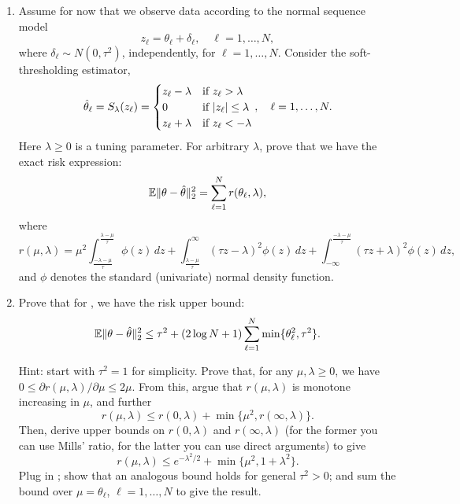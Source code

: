 \documentclass{article}
\begin{document}
\begin{enumerate}[label=(\alph*)]
\item Assume for now that we observe data according to the normal sequence model  
  \begin{equation}
  \label{eq:sequence_model}
  z_\ell = \theta_\ell + \delta_\ell, \quad \ell=1,\dots,N,  
  \end{equation}
  where $\delta_\ell \sim N(0,\tau^2)$, independently, for
  $\ell=1,\dots,N$. Consider the soft-thresholding estimator,
  \[
  \hat{\theta}_\ell = S_\lambda(z_\ell) 
  = \begin{cases}
    z_\ell-\lambda & \text{if $z_\ell > \lambda$} \\
    0 & \text{if $|z_\ell| \leq \lambda$} \\
    z_\ell+\lambda & \text{if $z_\ell < -\lambda$}
  \end{cases}, 
  \quad \ell=1,\dots,N.
  \]
  Here $\lambda \geq 0$ is a tuning parameter. For arbitrary $\lambda$, prove
  that we have the exact risk expression:
  \marginpar{\small [3 pts]}
  \[
  \mathbb{E} \|\theta - \hat{\theta}\|_2^2 = \sum_{\ell=1}^N r(\theta_\ell, \lambda),   
  \]
  where
  \[
    r(\mu,\lambda) = \mu^2
    \int_{\frac{-\lambda-\mu}{\tau}}^{\frac{\lambda-\mu}{\tau}} \phi(z) \, dz +  
    \int_{\frac{\lambda-\mu}{\tau}}^\infty (\tau z- \lambda)^2 \phi(z) \, dz + 
    \int_{-\infty}^{\frac{-\lambda-\mu}{\tau}} (\tau z + \lambda)^2 \phi(z) \,
    dz, 
  \]
    and $\phi$ denotes the standard (univariate) normal density function. 

  \item Prove that for , we have the risk
    upper bound: 
  \marginpar{\small [5 pts]}
  \[
    \mathbb{E} \|\theta - \hat{\theta}\|_2^2 \leq \tau^2 + (2\log{N}+1) \sum_{\ell=1}^N
    \min\{\theta_\ell^2, \tau^2\}.   
  \]

  Hint: start with $\tau^2=1$ for simplicity. Prove that, for any $\mu,\lambda
  \geq 0$, we have $0 \leq \partial r(\mu,\lambda) / \partial \mu \leq
  2\mu$. From this, argue that $r(\mu,\lambda)$ is monotone increasing in $\mu$,
  and further    
  \[
  r(\mu,\lambda) \leq r(0,\lambda) + \min\{\mu^2, r(\infty,\lambda)\}.  
  \]
  Then, derive upper bounds on $r(0,\lambda)$ and $r(\infty,\lambda)$ (for the
  former you can use Mills' ratio, for the latter you can use direct arguments)
  to give     
  \[
  r(\mu,\lambda) \leq e^{-\lambda^2/2} + \min\{\mu^2,1+\lambda^2\}.  
  \]
  Plug in ; show that an analogous bound
  holds for general $\tau^2>0$; and sum the bound over $\mu = \theta_\ell$,
  $\ell=1,\ldots,N$ to give the result.    


\end{enumerate}
\end{document}
